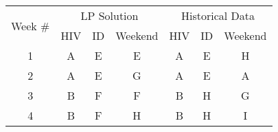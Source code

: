 \begin{table}[h]
	\tiny
 	\centering
    \begin{tabular}{c||ccc||ccc}
    	\multicolumn{1}{c||}{\multirow{2}[1]{*}{Week \#}} & \multicolumn{3}{c||}{LP Solution}                                                                                                                                       & \multicolumn{3}{c}{Historical Data}                                                                                                                                     \\
    	                                                  &                  HIV                  &                                 ID                                 &                              Weekend                               &                  HIV                  &                                 ID                                 &                              Weekend                               \\ \midrule\midrule
    	                        1                         & \cellcolor[rgb]{ .663,  .816,  .557}A &                \cellcolor[rgb]{ .957,  .69,  .518}E                &                \cellcolor[rgb]{ .957,  .69,  .518}E                & \cellcolor[rgb]{ .663,  .816,  .557}A &                \cellcolor[rgb]{ .957,  .69,  .518}E                &               \cellcolor[rgb]{ .459,  .443,  .443}H                \\
    	                        2                         & \cellcolor[rgb]{ .663,  .816,  .557}A &                \cellcolor[rgb]{ .957,  .69,  .518}E                &                \cellcolor[rgb]{ .518,  .592,  .69}G                & \cellcolor[rgb]{ .663,  .816,  .557}A &                \cellcolor[rgb]{ .957,  .69,  .518}E                &               \cellcolor[rgb]{ .663,  .816,  .557}A                \\
    	                        3                         & \cellcolor[rgb]{ .608,  .761,  .902}B &               \cellcolor[rgb]{ .557,  .663,  .859}F                &               \cellcolor[rgb]{ .557,  .663,  .859}F                & \cellcolor[rgb]{ .608,  .761,  .902}B &               \cellcolor[rgb]{ .459,  .443,  .443}H                &                \cellcolor[rgb]{ .518,  .592,  .69}G                \\
    	                        4                         & \cellcolor[rgb]{ .608,  .761,  .902}B &               \cellcolor[rgb]{ .557,  .663,  .859}F                &               \cellcolor[rgb]{ .459,  .443,  .443}H                & \cellcolor[rgb]{ .608,  .761,  .902}B &               \cellcolor[rgb]{ .459,  .443,  .443}H                & \cellcolor[rgb]{ .251,  .251,  .251}\textcolor[rgb]{ 1,  1,  1}{I} \\

\end{tabular}
\end{table}
